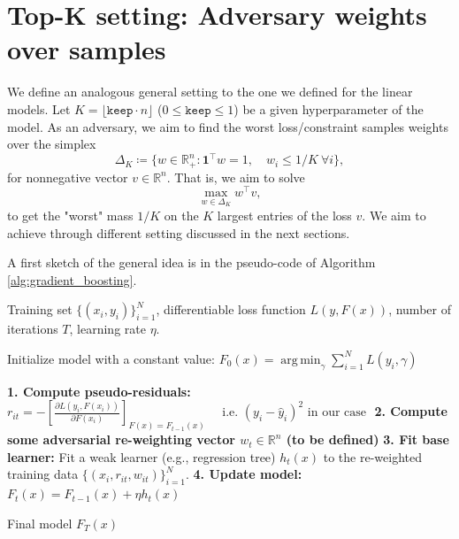\documentclass[11pt]{article}
\newcommand{\RR}{\mathbb{R}}
\newcommand{\one}{\mathbf{1}}
\theoremstyle{plain}
\theoremstyle{definition}
\newcommand{\1}{\mathbf{1}}
\begin{document}
\section{Top-K setting: Adversary weights over samples}

We define an analogous general setting to the one we defined for the linear models. Let $K=\lfloor \texttt{keep}\cdot n\rfloor$ ($0\le \texttt{keep}\le 1$) be a given hyperparameter of the model. As an adversary, we aim to find the worst loss/constraint samples weights over the simplex
\begin{equation}
\Delta_K \coloneqq \{w\in\RR_{+}^n: \one^\top w=1, \quad w_i\le 1/K\ \forall i\},
\end{equation}
for nonnegative vector $v\in\RR^n$. That is, we aim to solve $$\max_{w\in\Delta_K} w^\top v,$$ to get the "worst" mass $1/K$ on the $K$ largest entries of the loss $v$. We aim to achieve through different setting discussed in the next sections.

A first sketch of the general idea is in the pseudo-code of Algorithm \ref{alg:gradient_boosting}. 

\begin{algorithm}[!ht]
\caption{{\color{red}(Sketch of)} Adversarial Gradient Boosting Algorithm}
\label{alg:gradient_boosting}
\begin{algorithmic}[1] %

    \Require Training set $\{(x_i, y_i)\}_{i=1}^N$, differentiable loss function $L(y, F(x))$, number of iterations $T$, learning rate $\eta$.

    \State Initialize model with a constant value:
    $ F_0(x) = \operatorname*{arg\,min}_{\gamma} \sum_{i=1}^N L(y_i, \gamma) $

        
        \State \textbf{1. Compute pseudo-residuals:}
            \State $ r_{it} = - \left[ \frac{\partial L(y_i, F(x_i))}{\partial F(x_i)} \right]_{F(x)=F_{t-1}(x)} \quad \text{ i.e. }(y_i - \hat{y}_{i})^2 \text{ in our case }$
        \EndFor
        \State \textbf{{\color{red}2. Compute some adversarial re-weighting vector $w_t\in \mathbb{R}^n$ (to be defined)}}
        \State \textbf{3. Fit base learner:}
        \State Fit a weak learner (e.g., regression tree) $h_t(x)$ to the re-weighted training data $\{(x_i, r_{it}, w_{it})\}_{i=1}^N$.
        \State \textbf{4. Update model:}
        $ F_t(x) = F_{t-1}(x) + \eta h_t(x) $
        
    \EndFor

    \State \Return Final model $F_T(x)$

\end{algorithmic}
\end{algorithm}
\end{document}
